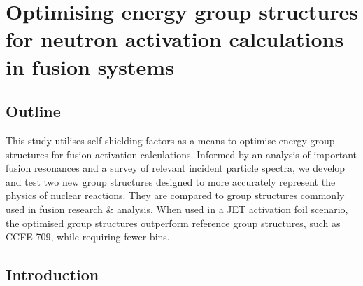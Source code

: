 \chapter{Optimising energy group structures for neutron activation calculations in fusion systems}

\ifpdf
    \graphicspath{{Chapter3/Figs/Raster/}{Chapter3/Figs/PDF/}{Chapter3/Figs/}}
\else
    \graphicspath{{Chapter3/Figs/Vector/}{Chapter3/Figs/}}
\fi



\section{Outline}
\label{S:1}

% 

This study utilises self-shielding factors as a means to optimise energy group structures for fusion activation calculations. Informed by an analysis of important fusion resonances and a survey of relevant incident particle spectra, we develop and test two new group structures designed to more accurately represent the physics of nuclear reactions. They are compared to group structures commonly used in fusion research \& analysis. When used in a JET activation foil scenario, the optimised group structures outperform reference group structures, such as CCFE-709, while requiring fewer bins.

\section{Introduction}




